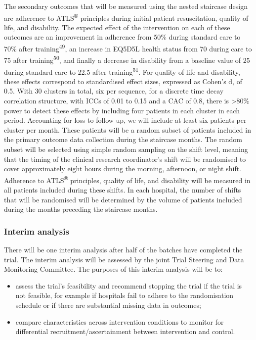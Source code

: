 \documentclass[
]{scrartcl}
\providecommand{\tightlist}{%
  \setlength{\itemsep}{0pt}\setlength{\parskip}{0pt}}\usepackage{longtable,booktabs,array}
\begin{document}
The secondary outcomes that will be measured using the nested staircase
design are adherence to ATLS\textsuperscript{®} principles during
initial patient resuscitation, quality of life, and disability. The
expected effect of the intervention on each of these outcomes are an
improvement in adherence from 50\% during standard care to 70\% after
training\textsuperscript{49}, an increase in EQ5D5L health status from
70 during care to 75 after training\textsuperscript{50}, and finally a
decrease in disability from a baseline value of 25 during standard care
to 22.5 after training\textsuperscript{51}. For quality of life and
disability, these effects correspond to standardised effect sizes,
expressed as Cohen's d, of 0.5. With 30 clusters in total, six per
sequence, for a discrete time decay correlation structure, with ICCs of
0.01 to 0.15 and a CAC of 0.8, there is \textgreater80\% power to detect
these effects by including four patients in each cluster in each period.
Accounting for loss to follow-up, we will include at least six patients
per cluster per month. These patients will be a random subset of
patients included in the primary outcome data collection during the
staircase months. The random subset will be selected using simple random
sampling on the shift level, meaning that the timing of the clinical
research coordinator's shift will be randomised to cover approximately
eight hours during the morning, afternoon, or night shift. Adherence to
ATLS\textsuperscript{®} principles, quality of life, and disability will
be measured in all patients included during these shifts. In each
hospital, the number of shifts that will be randomised will be
determined by the volume of patients included during the months
preceding the staircase months.

\subsubsection{Interim analysis}\label{interim-analysis}

There will be one interim analysis after half of the batches have
completed the trial. The interim analysis will be assessed by the joint
Trial Steering and Data Monitoring Committee. The purposes of this
interim analysis will be to:

\begin{itemize}
\tightlist
\item
  assess the trial's feasibility and recommend stopping the trial if the
  trial is not feasible, for example if hospitals fail to adhere to the
  randomisation schedule or if there are substantial missing data in
  outcomes;
\item
  compare characteristics across intervention conditions to monitor for
  differential recruitment/ascertainment between intervention and
  control.
\end{itemize}
\end{document}
